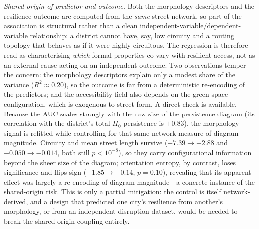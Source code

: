 \documentclass[sn-mathphys-num,pdflatex]{sn-jnl}
\begin{document}
\emph{Shared origin of predictor and outcome.} Both the morphology descriptors and
the resilience outcome are computed from the \emph{same} street network, so part of
the association is structural rather than a clean independent-variable/dependent-
variable relationship: a district cannot have, say, low circuity and a routing
topology that behaves as if it were highly circuitous. The
regression is therefore read as characterising \emph{which} formal properties co-vary with resilient
access, not as an external cause acting on an independent outcome. Two observations
temper the concern: the morphology descriptors explain only a modest share of the
variance ($R^2\approx0.20$), so the outcome is far from a
deterministic re-encoding of the predictors; and the accessibility field also
depends on the green-space configuration, which is exogenous to street form. A direct
check is available. Because the AUC scales strongly with the raw size of the
persistence diagram (its correlation with the district's total $H_0$ persistence is
$+0.83$), the morphology signal is refitted while controlling for that
same-network measure of diagram magnitude. Circuity and mean street length survive
($-7.39\to-2.88$ and $-0.050\to-0.014$, both still $p<10^{-8}$), so they carry
configurational information beyond the sheer size of the diagram; orientation entropy,
by contrast, loses significance and flips sign ($+1.85\to-0.14$, $p=0.10$), revealing
that its apparent effect was largely a re-encoding of diagram magnitude---a concrete
instance of the shared-origin risk. This is only a partial mitigation: the control is
itself network-derived, and a design that predicted one city's resilience from
another's morphology, or from an independent disruption dataset, would be
needed to break the shared-origin coupling entirely.
\end{document}
